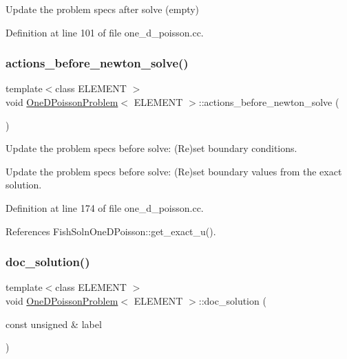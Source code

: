 Update the problem specs after solve (empty) 



Definition at line 101 of file one\+\_\+d\+\_\+poisson.\+cc.

\mbox{\label{classOneDPoissonProblem_a6e42423869771fbd216326cba516a76b}} 
\subsubsection{\texorpdfstring{actions\+\_\+before\+\_\+newton\+\_\+solve()}{actions\_before\_newton\_solve()}}
{\footnotesize\ttfamily template$<$class E\+L\+E\+M\+E\+NT $>$ \\
void \hyperlink{classOneDPoissonProblem}{One\+D\+Poisson\+Problem}$<$ E\+L\+E\+M\+E\+NT $>$\+::actions\+\_\+before\+\_\+newton\+\_\+solve (\begin{DoxyParamCaption}{ }\end{DoxyParamCaption})}



Update the problem specs before solve\+: (Re)set boundary conditions. 

Update the problem specs before solve\+: (Re)set boundary values from the exact solution. 

Definition at line 174 of file one\+\_\+d\+\_\+poisson.\+cc.



References Fish\+Soln\+One\+D\+Poisson\+::get\+\_\+exact\+\_\+u().

\mbox{\label{classOneDPoissonProblem_aaf42d034e42e7615acfa262a9c56b638}} 
\subsubsection{\texorpdfstring{doc\+\_\+solution()}{doc\_solution()}}
{\footnotesize\ttfamily template$<$class E\+L\+E\+M\+E\+NT $>$ \\
void \hyperlink{classOneDPoissonProblem}{One\+D\+Poisson\+Problem}$<$ E\+L\+E\+M\+E\+NT $>$\+::doc\+\_\+solution (\begin{DoxyParamCaption}\item[{const unsigned \&}]{label }\end{DoxyParamCaption})}



